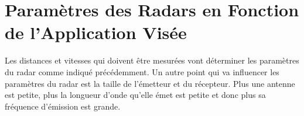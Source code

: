 \section{Paramètres des Radars en Fonction de l'Application Visée}

Les distances et vitesses qui doivent être mesurées vont déterminer les paramètres du radar comme indiqué précédemment. Un autre point qui va influencer les paramètres du radar est la taille de l'émetteur et du récepteur. Plus une antenne est petite, plus la longueur d'onde qu'elle émet est petite et donc plus sa fréquence d'émission est grande.   